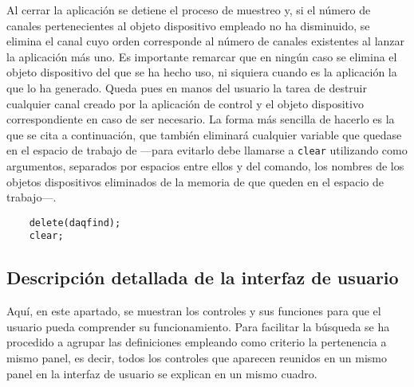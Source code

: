 Al cerrar la aplicación se detiene el proceso de muestreo y, si el número
de canales pertenecientes al objeto dispositivo empleado no ha disminuido,
se elimina el canal cuyo orden corresponde al número de canales existentes
al lanzar la aplicación más uno. Es importante remarcar que en ningún caso
se elimina el objeto dispositivo del que se ha hecho uso, ni siquiera
cuando es la aplicación la que lo ha generado. Queda pues en manos del
usuario la tarea de destruir cualquier canal creado por la aplicación de
control y el objeto dispositivo correspondiente en caso de ser necesario.
La forma más sencilla de hacerlo es la que se cita a continuación, que
también eliminará cualquier variable que quedase en el espacio de trabajo
de \matlab{} ---para evitarlo debe llamarse a \texttt{clear} utilizando
como argumentos, separados por espacios entre ellos y del comando, los
nombres de los objetos dispositivos eliminados de la memoria de \matlab{}
que queden en el espacio de trabajo---.

\begin{lstlisting}
	delete(daqfind);
	clear;
\end{lstlisting}


\subsection{Descripción detallada de la interfaz de usuario}

Aquí, en este apartado, se muestran los controles y sus funciones para que
el usuario pueda comprender su funcionamiento. Para facilitar la búsqueda
se ha procedido a agrupar las definiciones empleando como criterio la
pertenencia a mismo panel, es decir, todos los controles que aparecen
reunidos en un mismo panel en la interfaz de usuario se explican en un
mismo cuadro.

